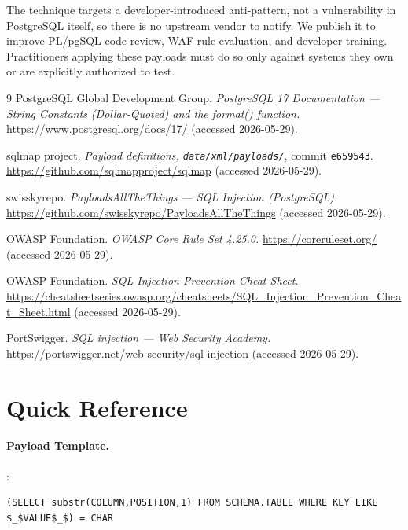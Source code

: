 \documentclass[11pt]{article}
\begin{document}
The technique targets a developer-introduced anti-pattern, not a vulnerability in
PostgreSQL itself, so there is no upstream vendor to notify. We publish it to
improve PL/pgSQL code review, WAF rule evaluation, and developer training.
Practitioners applying these payloads must do so only against systems they own or
are explicitly authorized to test.

\begin{thebibliography}{9}
 PostgreSQL Global Development Group.
\textit{PostgreSQL 17 Documentation --- String Constants (Dollar-Quoted) and the
format() function.} \url{https://www.postgresql.org/docs/17/} (accessed
2026-05-29).

 sqlmap project.
\textit{Payload definitions, \texttt{data/xml/payloads/}}, commit
\lstinline|e659543|. \url{https://github.com/sqlmapproject/sqlmap} (accessed
2026-05-29).

 swisskyrepo.
\textit{PayloadsAllTheThings --- SQL Injection (PostgreSQL).}
\url{https://github.com/swisskyrepo/PayloadsAllTheThings} (accessed 2026-05-29).

 OWASP Foundation.
\textit{OWASP Core Rule Set 4.25.0.} \url{https://coreruleset.org/} (accessed
2026-05-29).

 OWASP Foundation.
\textit{SQL Injection Prevention Cheat Sheet.}
\url{https://cheatsheetseries.owasp.org/cheatsheets/SQL_Injection_Prevention_Cheat_Sheet.html}
(accessed 2026-05-29).

 PortSwigger.
\textit{SQL injection --- Web Security Academy.}
\url{https://portswigger.net/web-security/sql-injection} (accessed 2026-05-29).
\end{thebibliography}

\appendix
\section{Quick Reference}

\paragraph{Payload Template.}:

\begin{lstlisting}
(SELECT substr(COLUMN,POSITION,1) FROM SCHEMA.TABLE WHERE KEY LIKE $_$VALUE$_$) = CHAR
\end{lstlisting}
\end{document}
